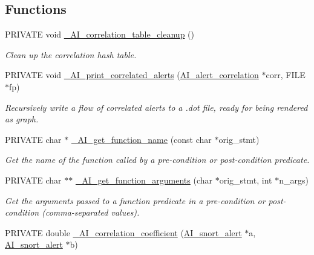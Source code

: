 \subsection*{Functions}
\begin{DoxyCompactItemize}
\item 
PRIVATE void \hyperlink{group__correlation_ga9bcb94264ffe30f113f3fb7287b774e3}{\_\-AI\_\-correlation\_\-table\_\-cleanup} ()
\begin{DoxyCompactList}\small\item\em Clean up the correlation hash table. \item\end{DoxyCompactList}\item 
PRIVATE void \hyperlink{group__correlation_ga4267a39fa1a5ac035015823bca43288e}{\_\-AI\_\-print\_\-correlated\_\-alerts} (\hyperlink{structAI__alert__correlation}{AI\_\-alert\_\-correlation} $\ast$corr, FILE $\ast$fp)
\begin{DoxyCompactList}\small\item\em Recursively write a flow of correlated alerts to a .dot file, ready for being rendered as graph. \item\end{DoxyCompactList}\item 
PRIVATE char $\ast$ \hyperlink{group__correlation_ga7a1b2d01f526f24ea91d7f08bdefd4fe}{\_\-AI\_\-get\_\-function\_\-name} (const char $\ast$orig\_\-stmt)
\begin{DoxyCompactList}\small\item\em Get the name of the function called by a pre-\/condition or post-\/condition predicate. \item\end{DoxyCompactList}\item 
PRIVATE char $\ast$$\ast$ \hyperlink{group__correlation_gab716702cd226ab2ad957234a92da6e4a}{\_\-AI\_\-get\_\-function\_\-arguments} (char $\ast$orig\_\-stmt, int $\ast$n\_\-args)
\begin{DoxyCompactList}\small\item\em Get the arguments passed to a function predicate in a pre-\/condition or post-\/condition (comma-\/separated values). \item\end{DoxyCompactList}\item 
PRIVATE double \hyperlink{group__correlation_ga9cb283b28a66829574add58a251b93c6}{\_\-AI\_\-correlation\_\-coefficient} (\hyperlink{struct__AI__snort__alert}{AI\_\-snort\_\-alert} $\ast$a, \hyperlink{struct__AI__snort__alert}{AI\_\-snort\_\-alert} $\ast$b)
$$
\end{DoxyCompactItemize}
